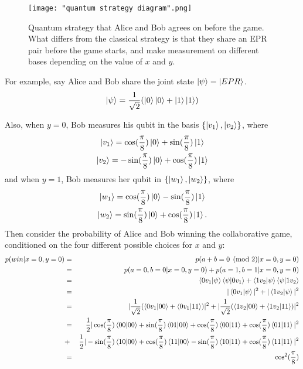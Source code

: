
\begin{figure}[h]
 \centering
    \texttt{[image: "quantum strategy diagram".png]}
    \caption{Quantum strategy that Alice and Bob agrees on before the game. What differs from the classical strategy is that they share an EPR pair before the game starts, and make measurement on different bases depending on the value of $x$ and $y$.}
    \label{fig: quantum strategy diagram}
\end{figure}

For example, say Alice and Bob share the joint state $\ket{\psi}=\ket{EPR}$. 
\begin{equation*}
    \ket{\psi}=\frac{1}{\sqrt{2}}(\ket{0} \ket{0}+\ket{1} \ket{1})
\end{equation*}

Also, when $y=0$, Bob measures his qubit in the basis $\{\ket{v_1}, \ket{v_2}\}$, where
\begin{gather*}
    \ket{v_1}=\cos(\frac{\pi}{8})\ket{0}+\sin(\frac{\pi}{8})\ket{1}\\
    \ket{v_2}=-\sin(\frac{\pi}{8})\ket{0}+\cos(\frac{\pi}{8})\ket{1}  
\end{gather*}
and when $y = 1$, Bob measures her qubit in $\{\ket{w_1}, \ket{w_2}\}$, where
\begin{gather*}
    \ket{w_1}=\cos(\frac{\pi}{8})\ket{0}-\sin(\frac{\pi}{8})\ket{1}\\
    \ket{w_2}=\sin(\frac{\pi}{8})\ket{0}+\cos(\frac{\pi}{8})\ket{1}.
    \end{gather*}
Then consider the probability of Alice and Bob winning the collaborative game, conditioned on the four different possible choices for $x$ and $y$:
\begin{eqnarray*}
p(win|x=0,y=0)&=&p(a+b=0 \pmod{2}|x=0,y=0)\\
&=&p(a=0, b=0|x=0, y=0)+p(a=1, b=1|x=0, y=0)\\
&=&\braket{0 v_1|\psi}\braket{\psi|0v_1}+\braket{1 v_2|\psi}\braket{\psi|1v_2}\\
&=&|\braket{0 v_1|\psi}|^2 + |\braket{1 v_2|\psi}|^2\\
&=&|\frac{1}{\sqrt{2}}(\braket{0v_1|00}+\braket{0v_1|11})|^2+|\frac{1}{\sqrt{2}}(\braket{1v_2|00}+\braket{1v_2|11})|^2\\
&=&\frac{1}{2}|\cos(\frac{\pi}{8})\braket{00|00}+\sin(\frac{\pi}{8})\braket{01|00}+\cos(\frac{\pi}{8})\braket{00|11}+\cos(\frac{\pi}{8})\braket{01|11}|^2\\
&+&\frac{1}{2}|-\sin(\frac{\pi}{8})\braket{10|00}+\cos(\frac{\pi}{8})\braket{11|00}-\sin(\frac{\pi}{8})\braket{10|11}+\cos(\frac{\pi}{8})\braket{11|11}|^2\\
&=&\cos^2(\frac{\pi}{8})
\end{eqnarray*}

